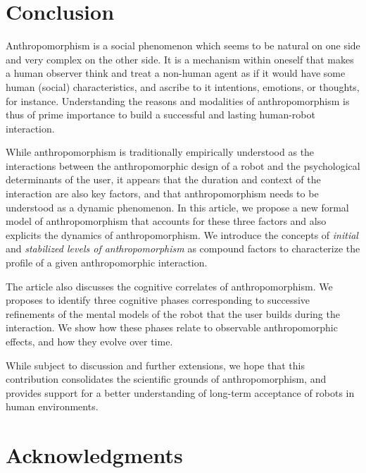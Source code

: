 \documentclass{frontiersSCNS} %
\begin{document}
%
%
%
%
%
%


\vspace{2cm}
\section{Conclusion}
\label{sec:conclusion}

Anthropomorphism is a social phenomenon which seems to be natural on one side
and very complex on the other side. It is a mechanism within oneself that makes
a human observer think and treat a non-human agent as if it would have some
human (social) characteristics, and ascribe to it intentions, emotions, or
thoughts, for instance. Understanding the reasons and modalities of
anthropomorphism is thus of prime importance to build a successful and lasting
human-robot interaction.

While anthropomorphism is traditionally empirically understood as the
interactions between the anthropomorphic design of a robot and the psychological
determinants of the user, it appears that the duration and context of the
interaction are also key factors, and that anthropomorphism needs to be
understood as a dynamic phenomenon. In this article, we propose a new formal
model of anthropomorphism that accounts for these three factors and also
explicits the dynamics of anthropomorphism. We introduce the concepts of
\emph{initial} and \emph{stabilized levels of anthropomorphism} as compound
factors to characterize the profile of a given anthropomorphic interaction.

The article also discusses the cognitive correlates of anthropomorphism. We
proposes to identify three cognitive phases corresponding to successive
refinements of the mental models of the robot that the user builds during the
interaction. We show how these phases relate to observable anthropomorphic
effects, and how they evolve over time.

While subject to discussion and further extensions, we hope that this
contribution consolidates the scientific grounds of anthropomorphism, and
provides support for a better understanding of long-term acceptance of robots in
human environments.

\vspace{2cm}
\section*{Acknowledgments}
\end{document}
